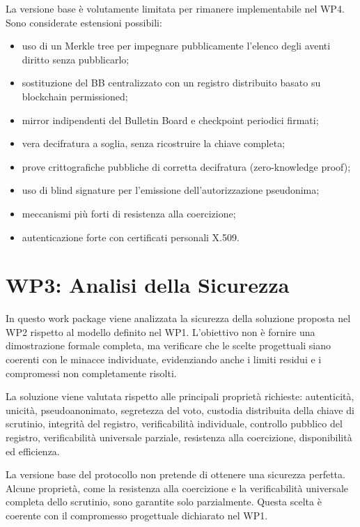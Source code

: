 \documentclass[12pt,a4paper]{article}
\begin{document}
La versione base \`e volutamente limitata per rimanere implementabile nel WP4. Sono considerate estensioni possibili:

\begin{itemize}
\item uso di un Merkle tree per impegnare pubblicamente l'elenco degli aventi diritto senza pubblicarlo;
\item sostituzione del BB centralizzato con un registro distribuito basato su blockchain permissioned;
\item mirror indipendenti del Bulletin Board e checkpoint periodici firmati;
\item vera decifratura a soglia, senza ricostruire la chiave completa;
\item prove crittografiche pubbliche di corretta decifratura (zero-knowledge proof);
\item uso di blind signature per l'emissione dell'autorizzazione pseudonima;
\item meccanismi pi\`u forti di resistenza alla coercizione;
\item autenticazione forte con certificati personali X.509.
\end{itemize}

\newpage

\section{WP3: Analisi della Sicurezza}

In questo work package viene analizzata la sicurezza della soluzione proposta nel WP2 rispetto al modello definito nel WP1. L'obiettivo non \`e fornire una dimostrazione formale completa, ma verificare che le scelte progettuali siano coerenti con le minacce individuate, evidenziando anche i limiti residui e i compromessi non completamente risolti.

La soluzione viene valutata rispetto alle principali propriet\`a richieste: autenticit\`a, unicit\`a, pseudoanonimato, segretezza del voto, custodia distribuita della chiave di scrutinio, integrit\`a del registro, verificabilit\`a individuale, controllo pubblico del registro, verificabilit\`a universale parziale, resistenza alla coercizione, disponibilit\`a ed efficienza.

La versione base del protocollo non pretende di ottenere una sicurezza perfetta. Alcune propriet\`a, come la resistenza alla coercizione e la verificabilit\`a universale completa dello scrutinio, sono garantite solo parzialmente. Questa scelta \`e coerente con il compromesso progettuale dichiarato nel WP1.
\end{document}
